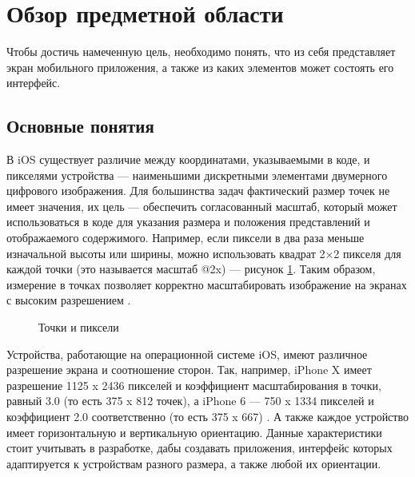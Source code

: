 \section{Обзор предметной области} \label{analysis}

Чтобы достичь намеченную цель, необходимо понять, что из себя представляет экран мобильного приложения, а также из каких элементов может состоять его интерфейс.

\subsection{Основные понятия}

В iOS существует различие между координатами, указываемыми в коде, и пикселями устройства \cite{pixel} --- наименьшими дискретными элементами двумерного цифрового изображения. 
Для большинства задач фактический размер точек \cite{point} не имеет значения, их цель --- обеспечить согласованный масштаб, который может использоваться в коде для указания размера и положения представлений и отображаемого содержимого. 
Например, если пиксели в два раза меньше изначальной высоты или ширины, можно использовать квадрат 2×2 пикселя для каждой точки (это называется масштаб @2x) --- рисунок \ref{fig:points}. 
Таким образом, измерение в точках позволяет корректно масштабировать изображение на экранах с высоким разрешением \cite{hig}.

\begin{figure}[h!]
	\caption{Точки и пиксели}
	\label{fig:points}
\end{figure}

Устройства, работающие на операционной системе iOS, имеют различное разрешение экрана и соотношение сторон. 
Так, например, iPhone X имеет разрешение 1125 x 2436 пикселей и коэффициент масштабирования в точки, равный 3.0 (то есть 375 x 812 точек), а iPhone 6  --- 750 x 1334 пикселей и коэффициент 2.0 соответственно (то есть 375 x 667) \cite{displays}. 
А также каждое устройство имеет горизонтальную и вертикальную ориентацию. 
Данные характеристики стоит учитывать в разработке, дабы создавать приложения, интерфейс которых адаптируется к устройствам разного размера, а также любой их ориентации. 

